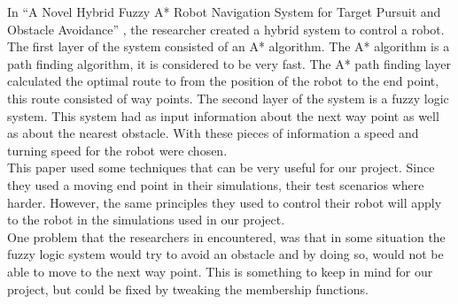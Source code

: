 \documentclass[conference]{IEEEtran}
\begin{document}
In ``A Novel Hybrid Fuzzy A* Robot Navigation
System for Target Pursuit and Obstacle Avoidance'' \cite{gerdelan2006novel}, the researcher created a hybrid system to control a robot. The first layer of the system consisted of an A* algorithm. The A* algorithm is a path finding algorithm, it is considered to be very fast. The A* path finding layer calculated the optimal route to from the position of the robot to the end point, this route consisted of way points. The second layer of the system is a fuzzy logic system. This system had as input information about the next way point as well as about the nearest obstacle. With these pieces of information a speed and turning speed for the robot were chosen.\\
This paper used some techniques that can be very useful for our project. Since they used a moving end point in their simulations, their test scenarios where harder. However, the same principles they used to control their robot will apply to the robot in the simulations used in our project.\\
One problem that the researchers in \cite{gerdelan2006novel} encountered, was that in some situation the fuzzy logic system would try to avoid an obstacle and by doing so, would not be able to move to the next way point. This is something to keep in mind for our project, but could be fixed by tweaking the membership functions.
\end{document}
